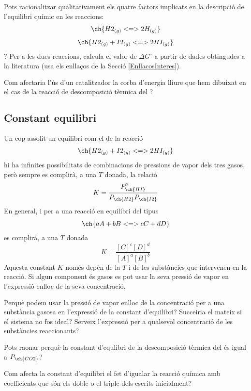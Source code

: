 \begin{exr}
Pots racionalitzar qualitativament els quatre factors implicats en la descripció de l'equilibri químic en les reaccions:
\[ \ch{H2_{(g)} <=> 2 H_{(g)}}\]
\[ \ch{H2_{(g)} + I2_{(g)} <=> 2 HI_{(g)}}\]?
Per a les dues reaccions, calcula el valor de $\Delta G^{\circ}$ a partir de dades obtingudes a la literatura (usa els enllaços de la Secció \ref{EnllacosInteres}).
\end{exr}

\begin{exr}
Com afectaria l'ús d'un catalitzador la corba d'energia lliure que hem dibuixat en el cas de la reacció de descomposició tèrmica del ?
\end{exr}

\subsection{Constant equilibri}

Un cop assolit un equilibri com el de la reacció 
\[ \ch{H2_{(g)} + I2_{(g)} <=> 2 HI_{(g)}}\]
hi ha infinites possibilitats de combinacions de pressions de vapor dels tres gasos, però sempre es complirà, a una $T$ donada, la relació
\[
K=\frac{P^2_{\ch{HI}}}{P_{\ch{H2}}P_{\ch{I2}}}
\]
En general, i per a una reacció en equilibri del tipus
\[
\ch{a A + b B <=> c C + d D}
\]
es complirà, a una $T$ donada
\[
K=\frac{[C]^c[D]^d}{[A]^a[B]^b}
\]
Aquesta constant $K$ només depèn de la $T$ i de les substàncies que intervenen en la reacció. Si algun component és gasos es pot usar la seva pressió de vapor en l'expressió enlloc de la seva concentració.
\begin{exr}
Perquè podem usar la pressió de vapor enlloc de la concentració per a una substància gasosa en l'expressió de la constant d'equilibri?
Succeiria el mateix si el sistema no fos ideal? Serveix l'expressió per a qualsevol concentració de les substàncies reaccionants?
\end{exr}

\begin{exr}
Pots raonar perquè la constant d'equlibri de la descomposició tèrmica del  és igual a $P_{\ch{CO2}}$?
\end{exr}

\begin{exr}
Com afecta la constant d'equilibri el fet d'igualar la reacció química amb coefficients que són els doble o el triple dels escrits inicialment?
\end{exr}

